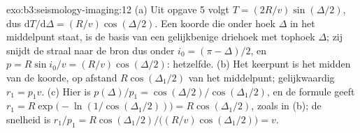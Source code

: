 \begin{solution}{exo:b3:seismology-imaging:12}
(a) Uit opgave 5 volgt $T = (2R/v)\sin(\Delta/2)$, dus $\mathrm dT/\mathrm d\Delta
= (R/v)\cos(\Delta/2)$. Een koorde die onder hoek $\Delta$ in het middelpunt staat, is
de basis van een gelijkbenige driehoek met tophoek $\Delta$; zij snijdt de straal
naar de bron dus onder $i_0 = (\pi - \Delta)/2$, en $p = R\sin i_0/v =
(R/v)\cos(\Delta/2)$: hetzelfde. (b) Het keerpunt is het midden van de
koorde, op afstand $R\cos(\Delta_1/2)$ van het middelpunt; gelijkwaardig
$r_1 = p_1v$. (c) Hier is $p(\Delta)/p_1 = \cos(\Delta/2)/\cos(\Delta_1/2)$, en
de formule geeft $r_1 = R\exp\bigl(-\ln(1/\cos(\Delta_1/2))\bigr) =
R\cos(\Delta_1/2)$, zoals in (b); de snelheid is $r_1/p_1 = R\cos(\Delta_1/2)\big/
\bigl((R/v)\cos(\Delta_1/2)\bigr) = v$.
\end{solution}

